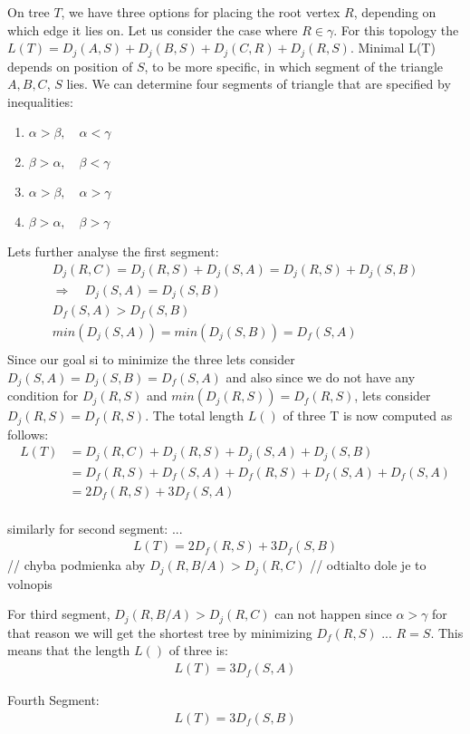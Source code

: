\documentclass[12pt]{article}
\begin{document}
	On tree \( T \), we have three options for placing the root vertex \( R \), depending on which edge it lies on. Let us consider the case where \( R \in \gamma \). For this topology the \( L(T) = D_j(A, S) + D_j(B, S) + D_j(C, R) + D_j(R, S) \). Minimal L(T) depends on position of \( S \), to be more specific, in which segment of the triangle \( A , B , C \), \(S\) lies. We can determine four segments of triangle that are specified by inequalities:
	\begin{enumerate}
	\item \( \alpha > \beta, \quad \alpha < \gamma \)
	\item \( \beta > \alpha, \quad \beta < \gamma \)
	\item \( \alpha > \beta, \quad \alpha > \gamma \)
	\item \(  \beta > \alpha, \quad \beta > \gamma \)
	\end{enumerate}
	
	Lets further analyse the first segment:
	\begin{align*}
		D_j(R, C) = D_j(R, S) + D_j(S, A) = D_j(R, S) + D_j(S, B) \\
		\Rightarrow \quad D_j(S, A) = D_j(S, B) \\
		D_f(S, A) > D_f(S, B) \\
		min(D_j(S,A)) = min(D_j(S,B)) = D_f(S, A) \\
	\end{align*}
	Since our goal si to minimize the three lets consider \( D_j(S, A) = D_j(S, B) = D_f(S, A) \) and also since we do not have any condition for \(D_j(R, S)\) and \(min(D_j(R, S)) = D_f(R, S)\), lets consider \( D_j(R, S) = D_f(R, S)  \).
	The total length \( L() \) of three T is now computed as follows:
	\begin{align*}
		L(T) &= D_j(R, C) + D_j(R, S) + D_j(S, A) + D_j(S, B)\\
		&= D_f(R, S) + D_f(S, A) + D_f(R,S) + D_f(S, A) + D_f(S, A)\\
		&= 2 D_f(R, S) + 3 D_f(S, A) \\
	\end{align*}
	
	similarly for second segment: 
	...
	\begin{align*}
		L(T) = 2 D_f(R, S) + 3 D_f(S, B)
	\end{align*}
	 // chyba podmienka aby \(D_j(R, B/A) > D_j(R, C) \)
	 // odtialto dole je to volnopis
	 
	 For third segment, \(D_j(R, B/A) > D_j(R, C) \) can not happen since \(\alpha > \gamma \)
	for that reason we will get the shortest tree by minimizing \( D_f(R,S) \) ... \(R = S\). 
	This means that the length \( L() \) of three is:
	\begin{align*}
		L(T) = 3 D_f(S, A)
	\end{align*}
	
	Fourth Segment:
	\begin{align*}
		L(T) = 3 D_f(S, B)
	\end{align*}
		 
	 
		 
\end{document}

